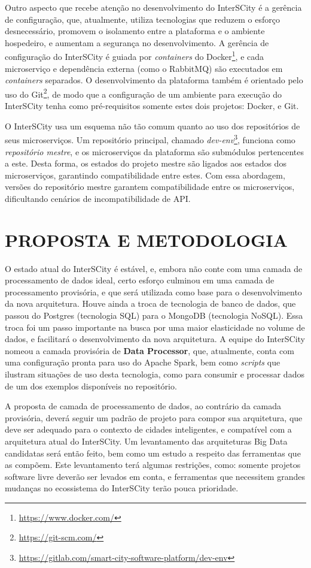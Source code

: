 Outro aspecto que recebe atenção no desenvolvimento do InterSCity é a gerência
de configuração, que, atualmente, utiliza tecnologias que reduzem o esforço
desnecessário, promovem o isolamento entre a plataforma e o ambiente hospedeiro,
e aumentam a segurança no desenvolvimento. A gerência de configuração do
InterSCity é guiada por \textit{containers} do
Docker\footnote{\url{https://www.docker.com/}}, e cada microserviço e
dependência externa (como o RabbitMQ) são executados em
\textit{containers} separados. O desenvolvimento da plataforma também é
orientado pelo uso do Git\footnote{\url{https://git-scm.com/}}, de modo que a
configuração de um ambiente para execução do InterSCity tenha como
pré-requisitos somente estes dois projetos: Docker, e Git.

O InterSCity usa um esquema não tão comum quanto ao uso dos repositórios de
seus microserviços. Um repositório principal, chamado
\textit{dev-env}\footnote{\url{https://gitlab.com/smart-city-software-platform/dev-env}},
funciona como \textit{repositório mestre}, e os microserviços da plataforma são
submódulos pertencentes a este. Desta forma, os estados do projeto mestre são
ligados aos estados dos microserviços, garantindo compatibilidade entre estes.
Com essa abordagem, versões do repositório mestre garantem compatibilidade
entre os microserviços, dificultando cenários de incompatibilidade de API.

\section{PROPOSTA E METODOLOGIA}

O estado atual do InterSCity é estável, e, embora não conte com uma camada de
processamento de dados ideal, certo esforço culminou em uma camada de
processamento provisória, e que será utilizada como base para o desenvolvimento
da nova arquitetura. Houve ainda a troca de tecnologia de banco de dados, que
passou do Postgres (tecnologia SQL) para o MongoDB (tecnologia NoSQL). Essa
troca foi um passo importante na busca por uma maior elasticidade no volume de
dados, e facilitará o desenvolvimento da nova arquitetura. A equipe do
InterSCity nomeou a camada provisória de \textbf{Data Processor}, que,
atualmente, conta com uma configuração pronta para uso do Apache Spark, bem
como \textit{scripts} que ilustram situações de uso desta tecnologia, como
para consumir e processar dados de um dos exemplos disponíveis no
repositório.

A proposta de camada de processamento de dados, ao contrário da camada
provisória, deverá seguir um padrão de projeto para compor sua arquitetura, que
deve ser adequado para o contexto de cidades inteligentes, e compatível com a
arquitetura atual do InterSCity. Um levantamento das arquiteturas Big Data
candidatas será então feito, bem como um estudo a respeito das ferramentas que
as compõem. Este levantamento terá algumas restrições, como: somente projetos
software livre deverão ser levados em conta, e ferramentas que necessitem
grandes mudanças no ecossistema do InterSCity terão pouca prioridade.

